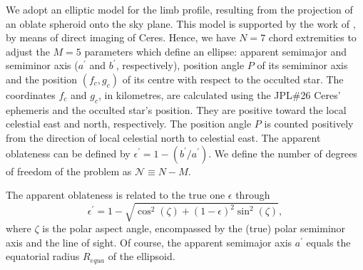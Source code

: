 \documentclass[useAMS,usenatbib]{mn2e}
\begin{document}
We adopt an elliptic model for the limb profile, resulting from the projection of an oblate spheroid onto the sky plane. This model is supported by the work of \cite{Drummond2014}, by means of direct imaging of Ceres. Hence, we have $N=7$ chord extremities to adjust the $M=5$ parameters which define an ellipse: apparent semimajor and semiminor axis ($a^\prime$ and $b^\prime$, respectively), position angle $P$ of its semiminor axis and the position $(f_c,g_c)$ of its centre with respect to the occulted star. The coordinates $f_{c}$ and $g_{c}$, in kilometres, are calculated using the JPL\#26 Ceres' ephemeris and the occulted star's position. They are positive toward the local celestial east and north, respectively. The position angle $P$ is counted positively from the direction of local celestial north to celestial east. The apparent oblateness can be defined by $\epsilon^\prime = 1 - (b^\prime/a^\prime)$. We define the number of degrees of freedom of the problem as $\mathcal{N} \equiv N - M$.


The apparent oblateness is related to the true one $\epsilon$ through
%
\begin{equation}
\epsilon^\prime = 1 - \sqrt{\cos^2(\zeta) + (1-\epsilon)^2\sin^2(\zeta)},
\label{Eq: TrueObla}
\end{equation}
%
where $\zeta$ is the polar aspect angle, encompassed by the (true) polar semiminor axis and the line of sight. Of course, the apparent semimajor axis $a^\prime$ equals the equatorial radius $R_{equa}$ of the ellipsoid.
\end{document}
